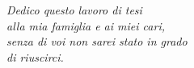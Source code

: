 \vspace*{20mm}
\begin{flushright}
    \doublespacing
  {\textit{\large Dedico questo lavoro di tesi \\ alla mia famiglia e ai miei cari, \\ senza di voi non sarei stato in grado \\ di riuscirci.\\}}
\end{flushright}

\clearpage{\pagestyle{empty}\cleardoublepage}

%    
%
